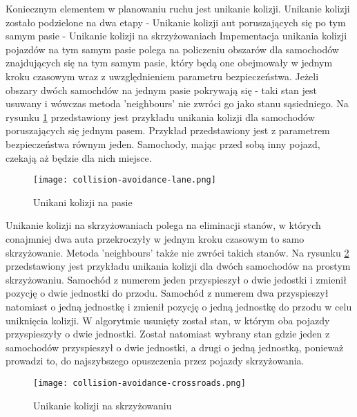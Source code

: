 Koniecznym elementem w planowaniu ruchu jest unikanie kolizji.
\newline
\newline
Unikanie kolizji zostało podzielone na dwa etapy
\newline
- Unikanie kolizji aut poruszających się po tym samym pasie
\newline
- Unikanie kolizji na skrzyżowaniach
\newline
\newline
Impementacja unikania kolizji pojazdów na tym samym pasie polega na policzeniu obszarów dla samochodów znajdujących się na tym samym pasie, który będą one obejmowały w jednym kroku czasowym wraz z uwzględnieniem parametru bezpieczeństwa.
\newline
\newline
Jeżeli obszary dwóch samochdów na jednym pasie pokrywają się - taki stan jest usuwany i wówczas metoda 'neighbours' nie zwróci go jako stanu sąsiedniego.
\newline
\newline
Na rysunku \ref{collision-avoidance-lane} przedstawiony jest przykładu unikania kolizji dla samochodów poruszających się jednym pasem. Przykład przedstawiony jest z parametrem bezpieczeństwa równym jeden. Samochody, mając przed sobą inny pojazd, czekają aż będzie dla nich miejsce.
\begin{figure}
    \texttt{[image: collision-avoidance-lane.png]}
  \caption{Unikani kolizji na pasie}
  \label{collision-avoidance-lane}
\end{figure}
\newpage
Unikanie kolizji na skrzyżowaniach polega na eliminacji stanów, w których conajmniej dwa auta przekroczyły w jednym kroku czasowym to samo skrzyżowanie. Metoda 'neighbours' także nie zwróci takich stanów.
\newline
\newline
Na rysunku \ref{collision-avoidance-crossroads} przedstawiony jest przykładu unikania kolizji dla dwóch samochodów na prostym skrzyżowaniu. Samochód z numerem jeden przyspieszył o dwie jedostki i zmienił pozycję o dwie jednostki do przodu. Samochód z numerem dwa przyspieszył natomiast o jedną jednostkę i zmienił pozycję o jedną jednostkę do przodu w celu uniknięcia kolizji.
\newline
\newline
W algorytmie usunięty został stan, w którym oba pojazdy przyspieszyły o dwie jednostki. Został natomiast wybrany stan gdzie jeden z samochodów przyspieszył o dwie jednostki, a drugi o jedną jednostką, ponieważ prowadzi to, do najszybszego opuszczenia przez pojazdy skrzyżowania.
\begin{figure}
    \texttt{[image: collision-avoidance-crossroads.png]}
  \caption{Unikanie kolizji na skrzyżowaniu}
  \label{collision-avoidance-crossroads}
\end{figure}
\newpage

